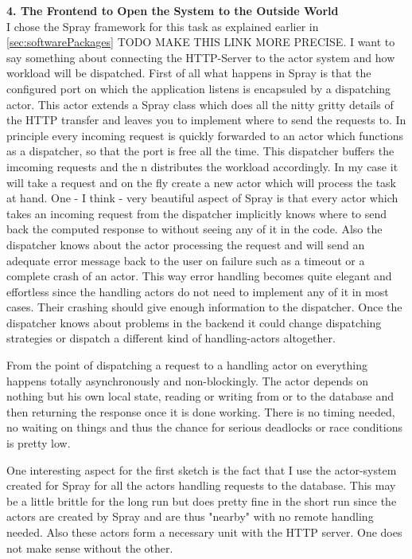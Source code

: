 \documentclass[11p]{scrartcl}
\begin{document}
\textbf{4. The Frontend to Open the System to the Outside World}\\
I chose the Spray framework for this task as explained earlier in \ref{sec:softwarePackages} TODO MAKE THIS LINK MORE PRECISE. I want to say something about connecting the HTTP-Server to the actor system and how workload will be dispatched.
First of all what happens in Spray is that the configured port on which the application listens is encapsuled by a dispatching actor. This actor extends a Spray class which does all the nitty gritty details of the HTTP transfer and leaves you to implement where to send the requests to. In principle every incoming request  is quickly forwarded to an actor which functions as a dispatcher, so that the port is free all the time. This dispatcher buffers the imcoming requests and the n distributes the workload accordingly. In my case it will take a request and on the fly create a new actor which will process the task at hand. One - I think - very beautiful aspect of Spray is that every actor which takes an incoming request from the dispatcher implicitly knows where to send back the computed response to without seeing any of it in the code. Also the dispatcher knows about the actor processing the request and will send an adequate error message back to the user on failure such as a timeout or a complete crash of an actor. This way error handling becomes quite elegant and effortless since the handling actors do not need to implement any of it in most cases. Their crashing should give enough information to the dispatcher. Once the dispatcher knows about problems in the backend it could change dispatching strategies or dispatch a different kind of handling-actors altogether.

From the point of dispatching a request to a handling actor on everything happens totally asynchronously and non-blockingly. The actor depends on nothing but his own local state, reading or writing from or to the database and then returning the response once it is done working. There is no timing needed, no waiting on things and thus the chance for serious deadlocks or race conditions is pretty low.

One interesting aspect for the first sketch is the fact that I use the actor-system created for Spray for all the actors handling requests to the database. This may be a little brittle for the long run but does pretty fine in the short run since the actors are created by Spray and are thus "nearby" with no remote handling needed. Also these actors form a necessary unit with the HTTP server. One does not make sense without the other.
\end{document}
